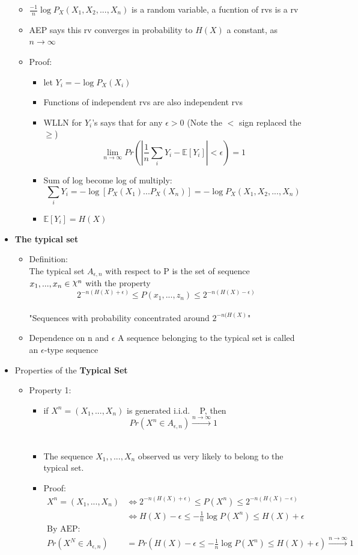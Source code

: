 \documentclass[24pt]{article}
\DeclareRobustCommand{\rchi}{{\mathpalette\irchi\relax}}
\newcommand{\irchi}[2]{\raisebox{\depth}{$#1\chi$}} %
\begin{document}
\begin{itemize}
\begin{itemize}
\item $\frac{-1}{n} \log P_X(X_1,X_2,...,X_n)$ is a random variable, a fucntion of rvs is a rv
\item AEP says this rv converges in probability to $H(X)$ a constant, as $n \rightarrow \infty$
\item Proof:
\begin{itemize}
\item let $Y_i = - \log P_X(X_i)$
\item Functions of independent rvs are also independent rvs
\item WLLN for $Y_i$'s says that for any $\epsilon > 0$ (Note the $<$ sign replaced the $\ge$)
$$\lim_{n \rightarrow \infty} Pr(|\frac{1}{n}\sum_i Y_i - \mathbb{E}[Y_i] | < \epsilon) = 1 $$
\item Sum of log become log of multiply:
$$\sum_i Y_i = -\log [P_X(X_1)...P_X(X_n)] = -\log P_X(X_1,X_2,...,X_n)$$ 
\item $\mathbb{E}[Y_i] = H(X)$
\end{itemize}

\end{itemize}
\item \textbf{The typical set} 
\begin{itemize}
\item Definition: \\
The typical set $ A_{ \epsilon , n } $ with respect to P is the set of sequence ${x_1,...,x_n} \in \rchi ^n$ with the property
$$2^{-n(H(X)+\epsilon)} \le P(x_1,...,z_n) \le 2^{-n(H(X)-\epsilon)}$$\\
"Sequences with probability concentrated around $2^{-n(H(X)}$"
\item Dependence on n and $\epsilon$
A sequence belonging to the typical set is called an $\epsilon $-type sequence 


\end{itemize}
\item Properties of the \textbf{Typical Set}
\begin{itemize}
\item Property 1: 
\begin{itemize}
\item if $X^n = (X_1,...,X_n)$ is generated i.i.d. ~ P, then 
$$ Pr(X^n \in A_{\epsilon,n}) \xrightarrow{n\rightarrow \infty} 1$$\\
\item The sequence $X_1,,...,X_n$ observed us very likely to belong to the typical set.
\item Proof:
\begin{align*}
X^n = (X_1,...,X_n) &\Leftrightarrow 2^{-n(H(X)+\epsilon)} \le P(X^n) \le 2^{-n(H(X)-\epsilon)} \\
&\Leftrightarrow H(X)-\epsilon \le -\frac{1}{n} \log P(X^n) \le H(X)+\epsilon \\
\textrm{By AEP:} \\
Pr(X^N \in A_{\epsilon,n}) &= Pr\left(H(X)-\epsilon \le -\frac{1}{n} \log P(X^n) \le H(X)+\epsilon \right) \xrightarrow{n\rightarrow \infty} 1
\end{align*}


\end{itemize}
\end{itemize}
\end{itemize}
\end{document}
